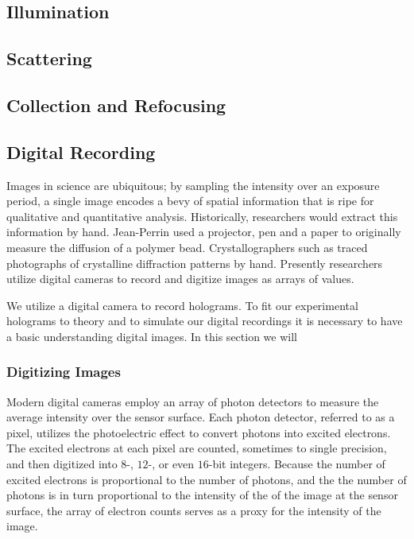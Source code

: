 \subsection{Illumination}
\label{ch:hvm:sec:hvm:ssec:illumination}


\subsection{Scattering}
\label{ch:hvm:sec:hvm:ssec:scattering}
  

\subsection{Collection and Refocusing}

\subsection{Digital Recording}
\label{ch:hvm:sec:hvm:ssec:digitalrec}


Images in science are ubiquitous; by sampling the intensity over an exposure
period, a single image encodes a bevy of spatial information that is ripe
for qualitative and quantitative analysis. Historically, researchers would
extract this information by hand. Jean-Perrin used a projector, pen and a paper to originally
measure the diffusion of a polymer bead. Crystallographers such as %
traced photographs of crystalline diffraction patterns by hand. Presently researchers utilize
digital cameras to record and digitize images as arrays of values. 

We utilize a digital camera to record holograms. To fit our experimental holograms to
theory and to simulate our digital recordings it is necessary to have a basic
understanding digital images. In this section we will 

\subsubsection{Digitizing Images}
\label{ch:hvm:sec:hvm:ssec:digitalrec:sssec:digitizing}

Modern digital cameras employ an array of photon detectors to measure the
average intensity over the sensor surface. Each photon detector, referred to as a pixel,
utilizes the photoelectric effect to convert photons into excited electrons.
The excited electrons at each pixel are counted, sometimes to single precision, and
then digitized into $8$-, $12$-, or even $16$-bit integers. Because the number of
excited electrons is proportional to the number of photons, and the the number of
photons is in turn proportional to the intensity of the of the image at the
sensor surface, the array of electron counts serves as a proxy for the intensity
of the image.

